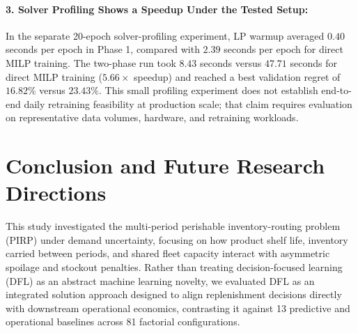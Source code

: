 \documentclass[11pt,a4paper]{article}
\theoremstyle{definition}
\theoremstyle{remark}
\begin{document}
\paragraph{3. Solver Profiling Shows a Speedup Under the Tested Setup:}
In the separate 20-epoch solver-profiling experiment, LP warmup averaged $0.40$ seconds per epoch in Phase 1, compared with $2.39$ seconds per epoch for direct MILP training. The two-phase run took $8.43$ seconds versus $47.71$ seconds for direct MILP training ($5.66\times$ speedup) and reached a best validation regret of $16.82\%$ versus $23.43\%$. This small profiling experiment does not establish end-to-end daily retraining feasibility at production scale; that claim requires evaluation on representative data volumes, hardware, and retraining workloads.

\section{Conclusion and Future Research Directions}
\label{sec:conclusion}

This study investigated the multi-period perishable inventory-routing problem (PIRP) under demand uncertainty, focusing on how product shelf life, inventory carried between periods, and shared fleet capacity interact with asymmetric spoilage and stockout penalties. Rather than treating decision-focused learning (DFL) as an abstract machine learning novelty, we evaluated DFL as an integrated solution approach designed to align replenishment decisions directly with downstream operational economics, contrasting it against 13 predictive and operational baselines across 81 factorial configurations.
\end{document}
